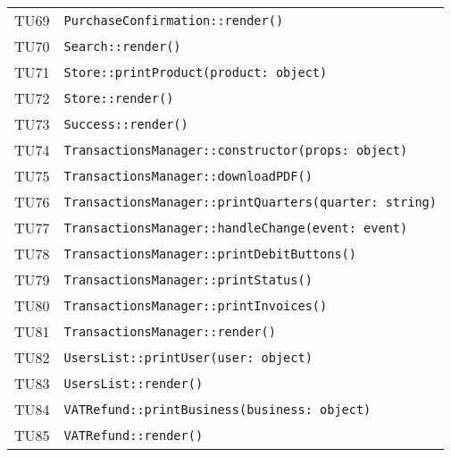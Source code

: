 \begin{longtable}{ >{\centering}p{} >{}p{}}
			\hypertarget{TU69}{TU69} & 
			\texttt{PurchaseConfirmation::render()}\\

			\hypertarget{TU70}{TU70} & 
			\texttt{Search::render()}\\

			\hypertarget{TU71}{TU71} & 
			\texttt{Store::printProduct(product: object)}\\

			\hypertarget{TU72}{TU72} & 
			\texttt{Store::render()}\\

			\hypertarget{TU73}{TU73} & 
			\texttt{Success::render()}\\

			\hypertarget{TU74}{TU74} & 
			\texttt{TransactionsManager::constructor(props: object)}\\

			\hypertarget{TU75}{TU75} & 
			\texttt{TransactionsManager::downloadPDF()}\\

			\hypertarget{TU76}{TU76} & 
			\texttt{TransactionsManager::printQuarters(quarter: string)}\\

			\hypertarget{TU77}{TU77} & 
			\texttt{TransactionsManager::handleChange(event: event)}\\

			\hypertarget{TU78}{TU78} & 
			\texttt{TransactionsManager::printDebitButtons()}\\

			\hypertarget{TU79}{TU79} & 
			\texttt{TransactionsManager::printStatus()}\\

			\hypertarget{TU80}{TU80} & 
			\texttt{TransactionsManager::printInvoices()}\\

			\hypertarget{TU81}{TU81} & 
			\texttt{TransactionsManager::render()}\\

			\hypertarget{TU82}{TU82} & 
			\texttt{UsersList::printUser(user: object)}\\

			\hypertarget{TU83}{TU83} & 
			\texttt{UsersList::render()}\\

			\hypertarget{TU84}{TU84} & 
			\texttt{VATRefund::printBusiness(business: object)}\\

			\hypertarget{TU85}{TU85} & 
			\texttt{VATRefund::render()}\\
			

\end{longtable}

